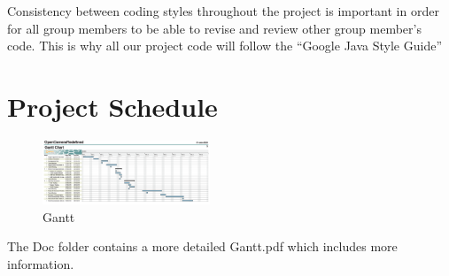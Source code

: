 \documentclass{article}
\begin{document}
Consistency between coding styles throughout the project is important in order for all group members to be able to revise and review other group member’s code. This is why all our project code will follow the “Google Java Style Guide”

\section{Project Schedule}

\begin{figure}[h!]
\centering
\includegraphics[width=50mm, scale = 2]{Gantt}
\caption{Gantt}
\label{fig:method}
\end{figure}
The Doc folder contains a more detailed Gantt.pdf which includes more information. 
\end{document}

